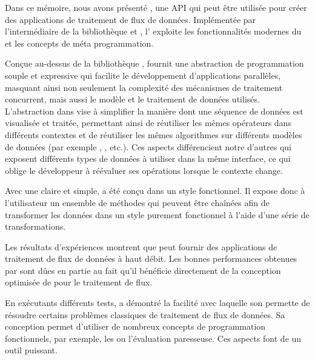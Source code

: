 
\begin{conclusion}
\label{conclusion.chap}

Dans ce m\'emoire, nous avons pr\'esent\'e , une API qui peut \^etre utilis\'ee pour cr\'eer des applications de traitement de flux de donn\'ees. Impl\'ement\'ee par l'interm\'ediaire de la biblioth\`eque  et , l' exploite les fonctionnalit\'es modernes du  et les concepts de m\'eta programmation.

Con\c cue au-dessus de la biblioth\`eque ,  fournit une abstraction de programmation souple et expressive qui facilite le d\'eveloppement d'applications parall\`eles, masquant ainsi non seulement la complexit\'e des m\'ecanismes de traitement concurrent, mais aussi le mod\`ele et le traitement de donn\'ees utilis\'es. L'abstraction dans  vise \`a simplifier la mani\`ere dont une s\'equence de donn\'ees est visualis\'ee et trait\'ee, permettant ainsi de r\'eutiliser les m\^emes op\'erateurs dans diff\'erents contextes et de r\'eutiliser les m\^emes algorithmes sur diff\'erents mod\`eles de donn\'ees (par exemple , ,  etc.). Ces aspects diff\'erencient notre  d'autres  qui exposent diff\'erents types de donn\'ees \`a utiliser dans la m\^eme interface, ce qui oblige le d\'eveloppeur \`a r\'e\'evaluer ses op\'erations lorsque le contexte change.

Avec une  claire et simple,  a \'et\'e con\c cu dans un style fonctionnel. Il expose donc \`a l'utilisateur un ensemble de m\'ethodes qui peuvent \^etre cha\^in\'ees afin de transformer les donn\'ees dans un style purement fonctionnel \`a l'aide d'une s\'erie de transformations.


Les r\'esultats d'exp\'eriences montrent que  peut fournir des applications de traitement de flux de donn\'ees \`a haut d\'ebit. Les bonnes performances obtenues par  sont d\^ues en partie au fait qu'il b\'en\'eficie directement de la conception optimis\'ee de  pour le traitement de flux.

En ex\'ecutants diff\'erents tests,  a d\'emontr\'e la facilit\'e avec laquelle son  permette de r\'esoudre certains probl\`emes classiques de traitement de flux de donn\'ees. Sa conception permet d'utiliser de nombreux concepts de programmation fonctionnels, par exemple, les  ou l'\'evaluation paresseuse. Ces aspects font de  un outil puissant.


\end{conclusion}
